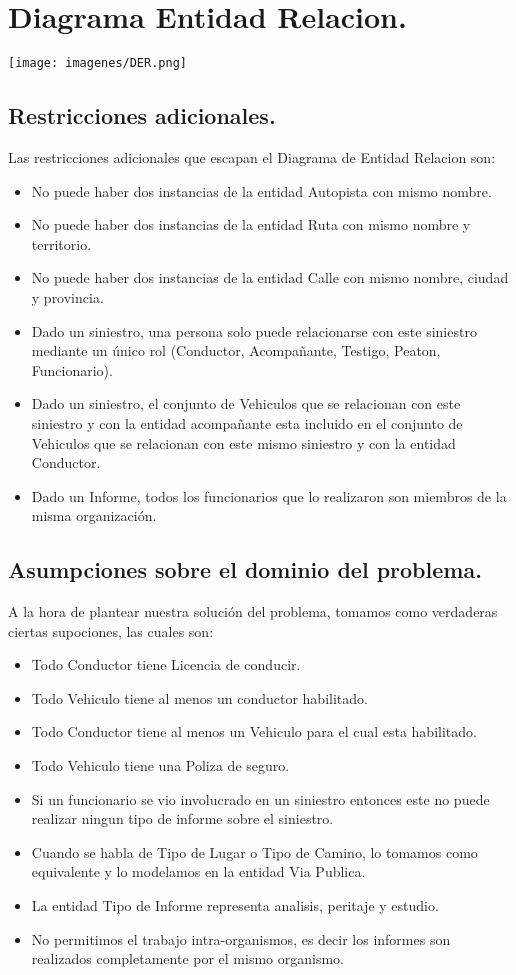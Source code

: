 \section{Diagrama Entidad Relacion.}

\texttt{[image: imagenes/DER.png]}

\subsection{Restricciones adicionales.}
Las restricciones adicionales que escapan el Diagrama de Entidad Relacion son:
\begin{itemize}
	\item No puede haber dos instancias de la entidad Autopista con mismo nombre.
	\item No puede haber dos instancias de la entidad Ruta con mismo nombre y territorio.
	\item No puede haber dos instancias de la entidad Calle con mismo nombre, ciudad y provincia.
	\item Dado un siniestro, una persona solo puede relacionarse con este siniestro mediante un único rol (Conductor, Acompañante, Testigo, Peaton, Funcionario).
	\item Dado un siniestro, el conjunto de Vehiculos que se relacionan con este siniestro y con la entidad acompañante esta incluido en el conjunto de Vehiculos que se relacionan con este mismo siniestro y con la entidad Conductor.
	\item Dado un Informe, todos los funcionarios que lo realizaron son miembros de la misma organización.
\end{itemize}



\subsection{Asumpciones sobre el dominio del problema.}
A la hora de plantear nuestra solución del problema, tomamos como verdaderas ciertas supociones, las cuales son:

\begin{itemize}
	\item Todo Conductor tiene Licencia de conducir.
	\item Todo Vehiculo tiene al menos un conductor habilitado.
	\item Todo Conductor tiene al menos un Vehiculo para el cual esta habilitado.
	\item Todo Vehiculo tiene una Poliza de seguro.
	\item Si un funcionario se vio involucrado en un siniestro entonces este no puede realizar ningun tipo de informe sobre el siniestro.
	\item Cuando se habla de Tipo de Lugar o Tipo de Camino, lo tomamos como equivalente y lo modelamos en la entidad Via Publica.
	\item La entidad Tipo de Informe representa analisis, peritaje y estudio.
	\item No permitimos el trabajo intra-organismos, es decir los informes son realizados completamente por el mismo organismo.
\end{itemize}